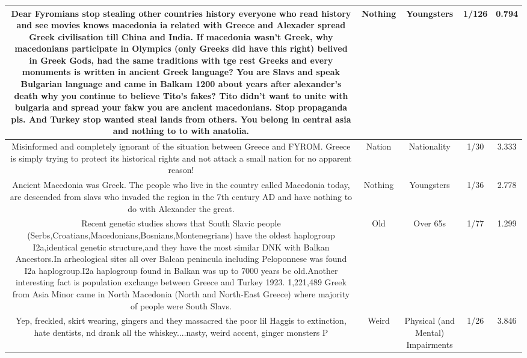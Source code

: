 \documentclass[11pt]{article}
\newlength\mylength
\begin{document}
\begin{center}
\begin{longtable}{|C{.40\mylength}|C{.30\mylength}|C{.15\mylength}|C{.15\mylength}|C{.15\mylength}|}
  Dear Fyromians stop stealing other countries history everyone who read history and see movies knows macedonia ia related with Greece and Alexader spread Greek civilisation till China and India. If macedonia wasn't Greek, why macedonians  participate in Olympics (only Greeks did have this right) belived in Greek Gods, had the same traditions with tge rest Greeks and every monuments is written in ancient Greek language? You are Slavs and speak Bulgarian language and came in Balkam 1200 about years after alexander's death why you continue to believe Tito's fakes? Tito didn't want to unite with bulgaria and spread your fakw you are ancient macedonians. Stop propaganda pls. And Turkey stop wanted steal lands from others. You belong in central asia and nothing to to with anatolia.  & Nothing & Youngsters & 1/126 & 0.794 \\  \hline
  Misinformed and completely ignorant of the situation between Greece and FYROM. Greece is simply trying to protect its historical rights and not attack a small nation for no apparent reason!  & Nation & Nationality & 1/30 & 3.333 \\  \hline
  Ancient Macedonia was Greek. The people who live in the country called Macedonia today, are descended from slavs who invaded the region in the 7th century AD and have nothing to do with Alexander the great.  & Nothing & Youngsters & 1/36 & 2.778 \\  \hline
  Recent genetic studies shows that  South Slavic people (Serbs,Croatians,Macedonians,Bosnians,Montenegrians) have the oldest haplogroup I2a,identical genetic structure,and they have the most similar DNK with Balkan Ancestors.In arheological sites all over Balcan penincula including Peloponnese was found I2a haplogroup.I2a haplogroup found in Balkan was up to 7000 years bc old.Another interesting fact is population exchange between Greece and Turkey 1923. 1,221,489 Greek from Asia Minor came in  North Macedonia (North and North-East Greece) where majority of people were  South Slavs.  & Old & Over 65s & 1/77 & 1.299 \\  \hline
  Yep, freckled, skirt wearing, gingers and they massacred the poor lil Haggis to extinction, hate dentists, nd drank all the whiskey....nasty, weird accent, ginger monsters  P  & Weird & Physical (and Mental) Impairments & 1/26 & 3.846 \\  \hline

\end{longtable}
\end{center}
\end{document}
